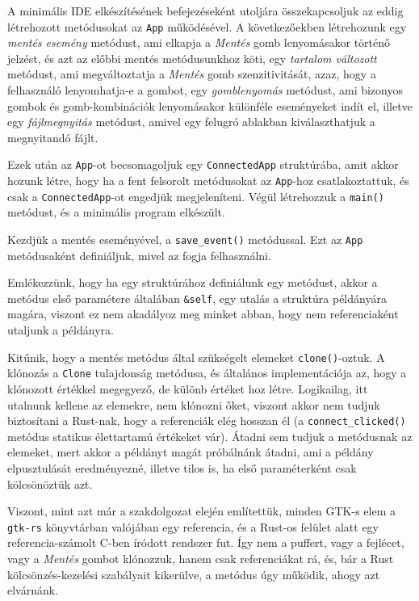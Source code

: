 
A minimális IDE elkészítésének befejezéseként utoljára összekapcsoljuk az eddig létrehozott
metódusokat az \texttt{App} működésével.
A következőekben létrehozunk egy \textit{mentés esemény} metódust, ami elkapja a \textit{Mentés} gomb
lenyomásakor történő jelzést, és azt az előbbi mentés metódusunkhoz köti,
egy \textit{tartalom változott} metódust, ami megváltoztatja a \textit{Mentés} gomb szenzitivitását,
azaz, hogy a felhasználó lenyomhatja-e a gombot,
egy \textit{gomblenyomás} metódust, ami bizonyos gombok és gomb-kombinációk lenyomásakor
különféle eseményeket indít el, illetve
egy \textit{fájlmegnyitás} metódust, amivel egy felugró ablakban kiválaszthatjuk a megnyitandó fájlt.

Ezek után az \texttt{App}-ot becsomagoljuk egy \texttt{ConnectedApp} struktúrába,
amit akkor hozunk létre, hogy ha a fent felsorolt metódusokat az \texttt{App}-hoz csatlakoztattuk,
és csak a \texttt{ConnectedApp}-ot engedjük megjeleníteni.
Végül létrehozzuk a \texttt{main()} metódust, és a minimális program elkészült.

Kezdjük a mentés eseményével, a \texttt{save\_event()} metódussal.
Ezt az \texttt{App} metódusaként definiáljuk, mivel az fogja felhasználni.



Emlékezzünk, hogy ha egy struktúrához definiálunk egy metódust, akkor a metódus első paramétere
általában \texttt{\&self}, egy utalás a struktúra példányára magára,
viszont ez nem akadályoz meg minket abban, hogy nem referenciaként utaljunk a példányra.

Kitűnik, hogy a mentés metódus által szükségelt elemeket \texttt{clone()}-oztuk.
A klónozás a \texttt{Clone} tulajdonság metódusa, és általános implementációja az,
hogy a klónozott értékkel megegyező, de különb értéket hoz létre.
Logikailag, itt utalnunk kellene az elemekre, nem klónozni őket, viszont akkor nem tudjuk
biztosítani a Rust-nak, hogy a referenciák elég hosszan él 
(a \texttt{connect\_clicked()} metódus statikus élettartamú értékeket vár).
Átadni sem tudjuk a metódusnak az elemeket, mert akkor a példányt magát próbálnánk átadni,
ami a példány elpusztulását eredményezné, illetve tilos is, ha első paraméterként csak kölcsönöztük azt.

Viszont, mint azt már a szakdolgozat elején említettük, minden GTK-s elem a \texttt{gtk-rs}
könyvtárban valójában egy referencia, és a Rust-os felület alatt egy referencia-számolt
C-ben íródott rendszer fut.
Így nem a puffert, vagy a fejlécet, vagy a \textit{Mentés} gombot klónozzuk, hanem csak referenciákat rá,
és, bár a Rust kölcsönzés-kezelési szabályait kikerülve, a metódus úgy működik, ahogy azt elvárnánk.

